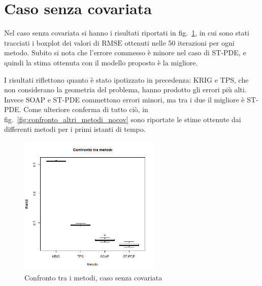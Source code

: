 \documentclass[a4paper,11pt,twoside,openright]{book}							%
\begin{document}
\newpage
\section{Caso senza covariata}
Nel caso senza covariata si hanno i risultati riportati in fig.~\ref{fig:cfr}, in cui sono stati tracciati i boxplot dei valori di $\mathrm{RMSE}$ ottenuti nelle 50 iterazioni per ogni metodo. Subito si nota che l'errore commesso è minore nel caso di ST-PDE, e quindi la stima ottenuta con il modello proposto è la migliore.

I risultati riflettono quanto è stato ipotizzato in precedenza: KRIG e TPS, che non considerano la geometria del problema, hanno prodotto gli errori più alti. Invece SOAP e ST-PDE commettono errori minori, ma tra i due il migliore è ST-PDE. Come ulteriore conferma di tutto ciò, in fig.~\ref{fig:confronto_altri_metodi_nocov} sono riportate le stime ottenute dai differenti metodi per i primi istanti di tempo.  

\begin{figure}[t]
	\centering
	\includegraphics[width=0.60\textwidth]{Immagini/Confronto_metodi.png}   
	\caption{Confronto tra i metodi, caso senza covariata}
	\label{fig:cfr}
\end{figure}
\end{document}
